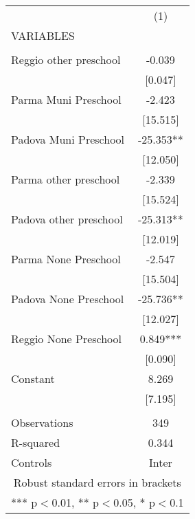 \begin{tabular}{lc} \hline
 & (1) \\
VARIABLES &  \\ \hline
 &  \\
Reggio other preschool & -0.039 \\
 & [0.047] \\
Parma Muni Preschool & -2.423 \\
 & [15.515] \\
Padova Muni Preschool & -25.353** \\
 & [12.050] \\
Parma other preschool & -2.339 \\
 & [15.524] \\
Padova other preschool & -25.313** \\
 & [12.019] \\
Parma None Preschool & -2.547 \\
 & [15.504] \\
Padova None Preschool & -25.736** \\
 & [12.027] \\
Reggio None Preschool & 0.849*** \\
 & [0.090] \\
Constant & 8.269 \\
 & [7.195] \\
 &  \\
Observations & 349 \\
R-squared & 0.344 \\
 Controls & Inter \\ \hline
\multicolumn{2}{c}{ Robust standard errors in brackets} \\
\multicolumn{2}{c}{ *** p$<$0.01, ** p$<$0.05, * p$<$0.1} \\
\end{tabular}

